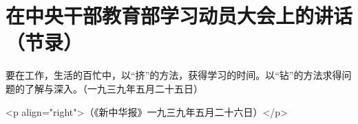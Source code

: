 \section[在中央干部教育部学习动员大会上的讲话（节录）（一九三九年五月二十五日）]{在中央干部教育部学习动员大会上的讲话（节录）}


要在工作，生活的百忙中，以“挤”的方法，获得学习的时间。以“钻”的方法求得问题的了解与深入。（一九三九年五月二十五日）

<p align="right">（《新中华报》一九三九年五月二十六日）</p>

